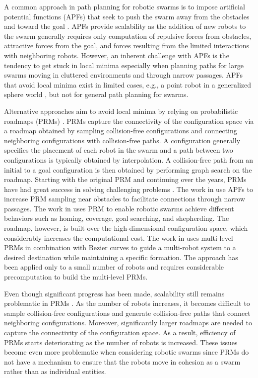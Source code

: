 \documentclass[letterpaper, 10pt, conference]{ieeeconf}
\begin{document}
A common approach in path planning for robotic swarms is to impose
artificial potential functions (APFs) that seek to push the swarm away
from the obstacles and toward the goal
\cite{Khatib86,reif1999social,book:SwarmsAPFs,tanner2005formation}. APFs
provide scalability as the addition of new robots to the swarm
generally requires only computation of repulsive forces from
obstacles, attractive forces from the goal, and forces resulting from
the limited interactions with neighboring robots.  However, an
inherent challenge with APFs is the tendency to get stuck in local
minima especially when planning paths for large swarms moving in
cluttered environments and through narrow passages.  APFs that avoid
local minima exist in limited cases, e.g., a point robot in a
generalized sphere world \cite{RK92}, but not for general path
planning for swarms.
 
Alternative approaches aim to avoid local minima by relying on
probabilistic roadmaps (PRMs) \cite{PRM}. PRMs capture the
connectivity of the configuration space via a roadmap obtained by
sampling collision-free configurations and connecting neighboring
configurations with collision-free paths. A configuration generally
specifies the placement of each robot in the swarm and a path between
two configurations is typically obtained by interpolation.  A
collision-free path from an initial to a goal configuration is then
obtained by performing graph search on the roadmap.  Starting with the
original PRM \cite{PRM} and continuing over the years, PRMs have had
great success in solving challenging problems
\cite{TogglePRM,UOBPRM,PlakuTRO05,HSUBridge,GaussianPRM,manocha12}.
The work in \cite{PRMapf1,PRMapf2} use APFs to increase PRM sampling
near obstacles to facilitate connections through narrow passages.  The
work in \cite{LienSwarming,LienSwarmingRules,LienShepherding} uses PRM
to enable robotic swarms achieve different behaviors such as homing,
coverage, goal searching, and shepherding. The roadmap, however, is
built over the high-dimensional configuration space, which
considerably increases the computational cost. The work in
\cite{KostasSwarm} uses multi-level PRMs in combination with Bezier
curves to guide a multi-robot system to a desired destination while
maintaining a specific formation. The approach has been applied only
to a small number of robots and requires considerable precomputation
to build the multi-level PRMs.


Even though significant progress has been made, scalability still
remains problematic in PRMs \cite{book:MP,book:LaValle}. As the number
of robots increases, it becomes difficult to sample collision-free
configurations and generate collision-free paths that connect
neighboring configurations. Moreover, significantly larger roadmaps
are needed to capture the connectivity of the configuration space.  As
a result, efficiency of PRMs starts deteriorating as the number of
robots is increased. These issues become even more problematic when
considering robotic swarms since PRMs do not have a mechanism to
ensure that the robots move in cohesion as a swarm rather than as
individual entities.
\end{document}

